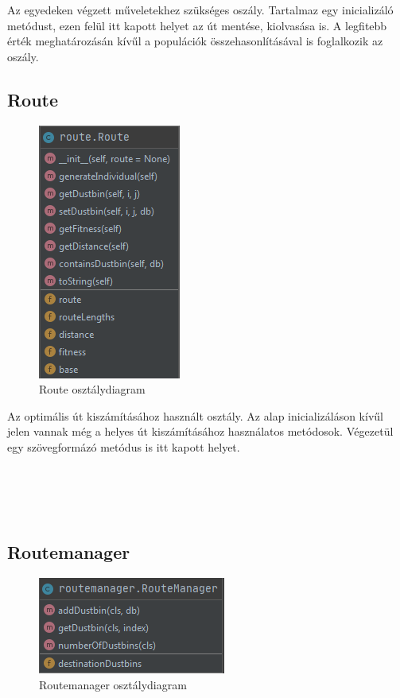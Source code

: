 Az egyedeken végzett műveletekhez szükséges oszály. Tartalmaz egy inicializáló metódust, ezen felül itt kapott helyet az út mentése, kiolvasása is. A legfitebb érték meghatározásán kívűl a populációk összehasonlításával is foglalkozik az oszály. 

\subsection{
Route
}

\begin{figure}[!htb]
\centering
\includegraphics[scale=0.8]{images/route.png}
\caption{Route osztálydiagram}
\label{fig:route}
\end{figure}

Az optimális út kiszámításához használt osztály. Az alap inicializáláson kívűl jelen vannak még a helyes út kiszámításához használatos metódosok. Végezetül egy szövegformázó metódus is itt kapott helyet.
\\\
\\\
\\\
\\\

\subsection{
Routemanager
}

\begin{figure}[!htb]
\centering
\includegraphics[scale=0.8]{images/routemanager.png}
\caption{Routemanager osztálydiagram}
\label{fig:routeManager}
\end{figure}

